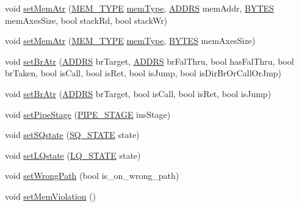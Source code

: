 \begin{DoxyCompactItemize}
\item 
void \hyperlink{classdynInstruction_a5751f811a01cf9f08e0b964db98a7c0e}{setMemAtr} (\hyperlink{global_2global_8h_a40bc49627faaf5adeed28388c6ffae9c}{MEM\_\-TYPE} \hyperlink{binaryTranslator_2global_8h_a94b8423a23b95a7adac22848b81e7c0c}{memType}, \hyperlink{binaryTranslator_2frontend_2stInstruction_8h_a7ea74bb9ffd2e4d41550ae2383dd25bc}{ADDRS} memAddr, \hyperlink{global_2global_8h_a430d9e51ff815ddfce06905ae7392e83}{BYTES} memAxesSize, bool stackRd, bool stackWr)
\item 
void \hyperlink{classdynInstruction_a2608f4e8ea89c4ea370f0dab131d78ba}{setMemAtr} (\hyperlink{global_2global_8h_a40bc49627faaf5adeed28388c6ffae9c}{MEM\_\-TYPE} \hyperlink{binaryTranslator_2global_8h_a94b8423a23b95a7adac22848b81e7c0c}{memType}, \hyperlink{global_2global_8h_a430d9e51ff815ddfce06905ae7392e83}{BYTES} memAxesSize)
\item 
void \hyperlink{classdynInstruction_ac71f51f5c4f207d4993acdfc0a2abbc1}{setBrAtr} (\hyperlink{binaryTranslator_2frontend_2stInstruction_8h_a7ea74bb9ffd2e4d41550ae2383dd25bc}{ADDRS} brTarget, \hyperlink{binaryTranslator_2frontend_2stInstruction_8h_a7ea74bb9ffd2e4d41550ae2383dd25bc}{ADDRS} brFalThru, bool hasFalThru, bool brTaken, bool isCall, bool isRet, bool isJump, bool isDirBrOrCallOrJmp)
\item 
void \hyperlink{classdynInstruction_a4d1879c3a2a4170fb103932044dc863f}{setBrAtr} (\hyperlink{binaryTranslator_2frontend_2stInstruction_8h_a7ea74bb9ffd2e4d41550ae2383dd25bc}{ADDRS} brTarget, bool isCall, bool isRet, bool isJump)
\item 
void \hyperlink{classdynInstruction_a0cb15d906e84b2efc8986b74edaf5adf}{setPipeStage} (\hyperlink{global_2global_8h_a015eb90e0de9f16e87bd149d4b9ce959}{PIPE\_\-STAGE} insStage)
\item 
void \hyperlink{classdynInstruction_a7fc66de5e3f826f515e41029619e2088}{setSQstate} (\hyperlink{global_2global_8h_af9e953470c71a91625fe1fc66f2dc49b}{SQ\_\-STATE} state)
\item 
void \hyperlink{classdynInstruction_a83a5077984f29a340de7bebc7e0b679c}{setLQstate} (\hyperlink{global_2global_8h_a49734aedeaf1d3f1c93c4778b3b62205}{LQ\_\-STATE} state)
\item 
void \hyperlink{classdynInstruction_a794898f3f2f9a99de5f8ca4b8f8999c4}{setWrongPath} (bool is\_\-on\_\-wrong\_\-path)
\item 
void \hyperlink{classdynInstruction_a2bad65ecd4bba5fea1ec26d1605a9677}{setMemViolation} ()
\item 

\end{DoxyCompactItemize}
